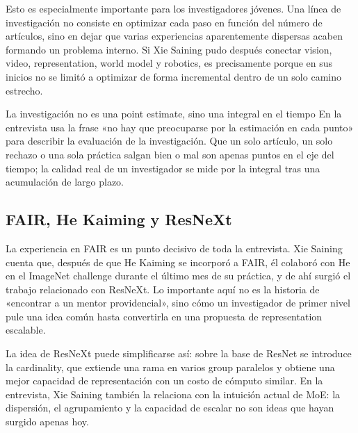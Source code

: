 Esto es especialmente importante para los investigadores jóvenes. Una línea de investigación no consiste en optimizar cada paso en función del número de artículos, sino en dejar que varias experiencias aparentemente dispersas acaben formando un problema interno. Si Xie Saining pudo después conectar vision, video, representation, world model y robotics, es precisamente porque en sus inicios no se limitó a optimizar de forma incremental dentro de un solo camino estrecho.

\begin{importantbox}{La investigación no es una point estimate, sino una integral en el tiempo}
En la entrevista usa la frase «no hay que preocuparse por la estimación en cada punto» para describir la evaluación de la investigación. Que un solo artículo, un solo rechazo o una sola práctica salgan bien o mal son apenas puntos en el eje del tiempo; la calidad real de un investigador se mide por la integral tras una acumulación de largo plazo.
\end{importantbox}

\subsection{FAIR, He Kaiming y ResNeXt}

La experiencia en FAIR es un punto decisivo de toda la entrevista. Xie Saining cuenta que, después de que He Kaiming se incorporó a FAIR, él colaboró con He en el ImageNet challenge durante el último mes de su práctica, y de ahí surgió el trabajo relacionado con ResNeXt. Lo importante aquí no es la historia de «encontrar a un mentor providencial», sino cómo un investigador de primer nivel pule una idea común hasta convertirla en una propuesta de representation escalable.

La idea de ResNeXt puede simplificarse así: sobre la base de ResNet se introduce la cardinality, que extiende una rama en varios group paralelos y obtiene una mejor capacidad de representación con un costo de cómputo similar. En la entrevista, Xie Saining también la relaciona con la intuición actual de MoE: la dispersión, el agrupamiento y la capacidad de escalar no son ideas que hayan surgido apenas hoy.

